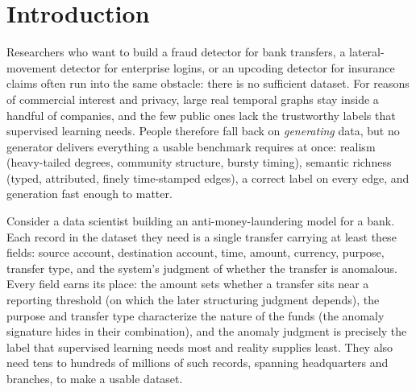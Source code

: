 \documentclass[sigconf,review,anonymous]{acmart}
\begin{document}
\maketitle

\section{Introduction}
\label{sec:intro}
Researchers who want to build a fraud detector for bank transfers, a
lateral-movement detector for enterprise logins, or an upcoding detector for insurance
claims often run into the same obstacle: there is no sufficient dataset. For reasons of
commercial interest and privacy, large real temporal graphs stay inside a handful of
companies, and the few public ones lack the trustworthy labels that supervised learning
needs. People therefore fall back on \emph{generating} data, but no generator delivers
everything a usable benchmark requires at once: realism (heavy-tailed degrees,
community structure, bursty timing), semantic richness (typed, attributed, finely
time-stamped edges), a correct label on every edge, and generation fast enough to
matter.

Consider a data scientist building an anti-money-laundering model for a bank.
Each record in the dataset they need is a single transfer carrying at least these
fields: source account, destination account, time, amount, currency, purpose, transfer
type, and the system's judgment of whether the transfer is anomalous. Every field
earns its place: the amount sets whether a transfer sits near a reporting threshold (on
which the later structuring judgment depends), the purpose and transfer type
characterize the nature of the funds (the anomaly signature hides in their
combination), and the anomaly judgment is precisely the label that supervised learning
needs most and reality supplies least. They also need tens to hundreds of millions of
such records, spanning headquarters and branches, to make a usable dataset.
\end{document}
